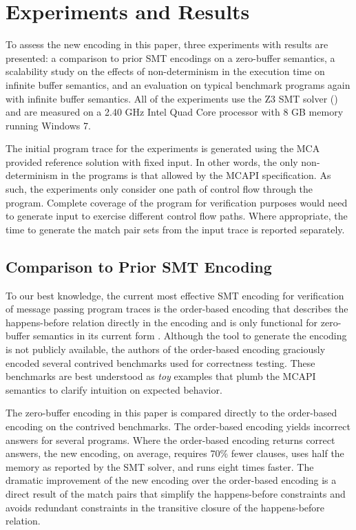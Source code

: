 \section{Experiments and Results}
To assess the new encoding in this paper, three experiments with
results are presented: a comparison to prior SMT encodings on a
zero-buffer semantics, a scalability study on the effects of
non-determinism in the execution time on infinite buffer semantics,
and an evaluation on typical benchmark programs again with infinite
buffer semantics. All of the experiments use the Z3 SMT solver
(\cite{demoura:tacas08}) and are measured on a 2.40 GHz Intel Quad
Core processor with 8 GB memory running Windows 7.

The initial program trace for the experiments is generated using the
MCA provided reference solution with fixed input. In other words, the
only non-determinism in the programs is that allowed by the MCAPI
specification. As such, the experiments only consider
one path of control flow through the program. Complete coverage of the
program for verification purposes would need to generate input to
exercise different control flow paths.  Where appropriate, the time to
generate the match pair sets from the input trace is reported
separately.

\subsection{Comparison to Prior SMT Encoding}
To our best knowledge, the current most effective SMT encoding for
verification of message passing program traces is the order-based
encoding that describes the happens-before relation directly in the
encoding and is only functional for zero-buffer semantics in its
current form \cite{elwakil:padtad10}. Although the tool to generate
the encoding is not publicly available, the authors of the order-based
encoding graciously encoded several contrived benchmarks used for
correctness testing. These benchmarks are best understood as
\emph{toy} examples that plumb the MCAPI semantics to clarify
intuition on expected behavior.

The zero-buffer encoding in this paper is compared directly to the
order-based encoding on the contrived benchmarks. The order-based
encoding yields incorrect answers for several programs. Where the
order-based encoding returns correct answers, the new encoding, on
average, requires 70\% fewer clauses, uses half the memory as reported
by the SMT solver, and runs eight times faster. The dramatic
improvement of the new encoding over the order-based encoding is a
direct result of the match pairs that simplify the happens-before
constraints and avoids redundant constraints in the transitive closure
of the happens-before relation.

